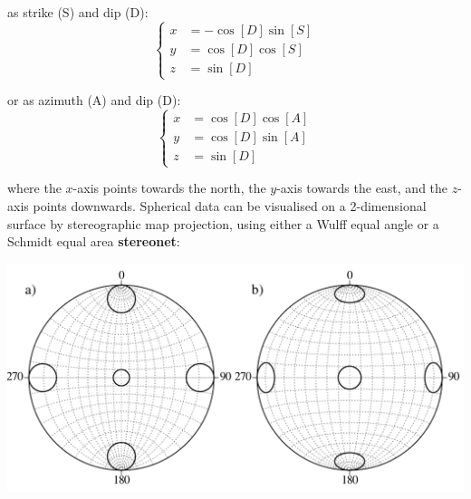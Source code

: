 \noindent as strike (S) and dip (D):
\begin{equation}
  \left\{
  \begin{split}
    x & = -\cos[D]\sin[S]\\
    y & = \cos[D]\cos[S]\\
    z & = \sin[D]
  \end{split}
  \right.
  \label{eq:SD}
\end{equation}

\noindent or as azimuth (A) and dip (D):
\begin{equation}
  \left\{
  \begin{split}
    x & = \cos[D] \cos[A]\\
    y & = \cos[D] \sin[A]\\
    z & = \sin[D]
  \end{split}
  \right.
  \label{eq:AD}
\end{equation}

\noindent where the $x$-axis points towards the north, the $y$-axis
towards the east, and the $z$-axis points downwards.  Spherical data
can be visualised on a 2-dimensional surface by stereographic map
projection, using either a Wulff equal angle or a Schmidt equal area
\textbf{stereonet}:

\noindent\begin{minipage}[t][][b]{.6\textwidth}
\includegraphics[width=\textwidth]{../figures/wulffschmidt.pdf}\medskip
\end{minipage}
\begin{minipage}[t][][t]{.4\textwidth}
  \label{fig:wulffschmidt}
\end{minipage}

